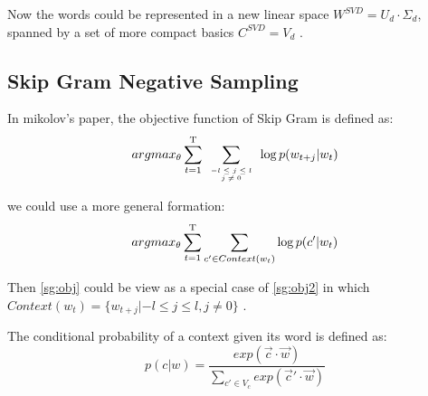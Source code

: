 \documentclass{article} %
\begin{document}
Now the words could be represented in a new linear space $W^{SVD}=U_d\cdot\Sigma_d$, spanned by a set of more compact basics $C^{SVD} = V_d$ .

\subsection{Skip Gram Negative Sampling}
In mikolov's paper, the objective function of Skip Gram is defined as:
\begin{equation}\label{sg:obj}
argmax_\theta \sum\limits_{t=1}^\mathrm{ T } \sum\limits_{\mbox{\tiny$\begin{array}{c}
-l \le j \le l\\
j\neq 0\end{array}$}}{\log{p(w_{t+j}|w_t)}} 
\end{equation}

we could use a more general formation:
\begin{equation}\label{sg:obj2}
argmax_\theta \sum\limits_{t=1}^\mathrm{ T } \sum\limits_{c' \in Context(w_t)}{\log{p(c'|w_t)}} \\
\end{equation}

Then \eqref{sg:obj} could be view as a special case of \eqref{sg:obj2} in which $Context(w_t) = \{w_{t+j}|-l \le j \le l,j\neq 0\}$ .

The conditional probability of a context given its word is defined as:
\begin{equation}\label{sg:prob}
p(c|w)= \frac{exp(\vec{c}\cdot\vec{w})}{\sum\limits_{c' \in V_c}{exp(\vec{c}'\cdot\vec{w})}} 
\end{equation}
\end{document}
